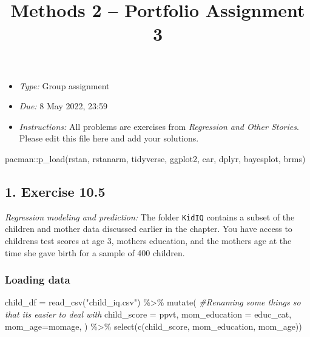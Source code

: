 \documentclass[
]{article}
\title{Methods 2 -- Portfolio Assignment 3}
\author{}
\date{\vspace{-2.5em}}
\newenvironment{Shaded}{\begin{snugshade}}{\end{snugshade}}
\newcommand{\AttributeTok}[1]{\textcolor[rgb]{0.77,0.63,0.00}{#1}}
\newcommand{\CommentTok}[1]{\textcolor[rgb]{0.56,0.35,0.01}{\textit{#1}}}
\newcommand{\FunctionTok}[1]{\textcolor[rgb]{0.00,0.00,0.00}{#1}}
\newcommand{\NormalTok}[1]{#1}
\newcommand{\OtherTok}[1]{\textcolor[rgb]{0.56,0.35,0.01}{#1}}
\newcommand{\SpecialCharTok}[1]{\textcolor[rgb]{0.00,0.00,0.00}{#1}}
\newcommand{\StringTok}[1]{\textcolor[rgb]{0.31,0.60,0.02}{#1}}
\providecommand{\tightlist}{%
  \setlength{\itemsep}{0pt}\setlength{\parskip}{0pt}}
\begin{document}
\maketitle

\begin{itemize}
\tightlist
\item
  \emph{Type:} Group assignment
\item
  \emph{Due:} 8 May 2022, 23:59
\item
  \emph{Instructions:} All problems are exercises from \emph{Regression
  and Other Stories}. Please edit this file here and add your solutions.
\end{itemize}

\begin{Shaded}
\begin{Highlighting}[]
\NormalTok{pacman}\SpecialCharTok{::}\FunctionTok{p\_load}\NormalTok{(rstan, rstanarm, tidyverse, ggplot2, car, dplyr, bayesplot, brms)}
\end{Highlighting}
\end{Shaded}

\hypertarget{exercise-10.5}{%
\subsection{1. Exercise 10.5}\label{exercise-10.5}}

\emph{Regression modeling and prediction:} The folder \texttt{KidIQ}
contains a subset of the children and mother data discussed earlier in
the chapter. You have access to childrens test scores at age 3, mothers
education, and the mothers age at the time she gave birth for a sample
of 400 children.

\hypertarget{loading-data}{%
\subsubsection{Loading data}\label{loading-data}}

\begin{Shaded}
\begin{Highlighting}[]
\NormalTok{child\_df }\OtherTok{=} \FunctionTok{read\_csv}\NormalTok{(}\StringTok{"child\_iq.csv"}\NormalTok{) }\SpecialCharTok{\%\textgreater{}\%} 
  \FunctionTok{mutate}\NormalTok{( }\CommentTok{\#Renaming some things so that it\textquotesingle{}s easier to deal with}
    \AttributeTok{child\_score =}\NormalTok{ ppvt,}
    \AttributeTok{mom\_education =}\NormalTok{ educ\_cat,}
    \AttributeTok{mom\_age=}\NormalTok{momage,}
\NormalTok{  ) }\SpecialCharTok{\%\textgreater{}\%} 
  \FunctionTok{select}\NormalTok{(}\FunctionTok{c}\NormalTok{(child\_score, mom\_education, mom\_age))}
\end{Highlighting}
\end{Shaded}
\end{document}

